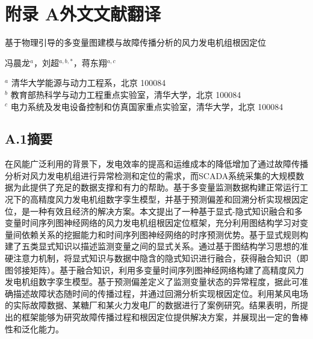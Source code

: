 \cleardoublepage
\chapter*{附录 A\quad 外文文献翻译}

\begin{center}
{\heiti\fontsize{14pt}{20pt}\selectfont 基于物理引导的多变量图建模与故障传播分析的风力发电机组根因定位}
\end{center}

\vspace{6pt}
\begin{center}
冯晨龙$^{a}$，刘超$^{a,b,*}$，蒋东翔$^{a,c}$

\vspace{4pt}
{\small
$^{a}$ 清华大学能源与动力工程系，北京 100084 \\
$^{b}$ 教育部热科学与动力工程重点实验室，清华大学，北京 100084 \\
$^{c}$ 电力系统及发电设备控制和仿真国家重点实验室，清华大学，北京 100084 \\
}
\end{center}

\vspace{6pt}

\vspace{12pt}

\section*{A.1\quad 摘要}

在风能广泛利用的背景下，发电效率的提高和运维成本的降低增加了通过故障传播分析对风力发电机组进行异常检测和定位的需求，而SCADA系统采集的大规模数据为此提供了充足的数据支撑和有力的帮助。基于多变量监测数据构建正常运行工况下的高精度风力发电机组数字孪生模型，并基于预测偏差和回溯分析实现根因定位，是一种有效且经济的解决方案。本文提出了一种基于显式-隐式知识融合和多变量时间序列图神经网络的风力发电机组根因定位框架，充分利用图结构学习对变量间依赖关系的挖掘能力和时间序列图神经网络的时序预测优势。基于显式规则构建了五类显式知识以描述监测变量之间的显式关系。通过基于图结构学习思想的准硬注意力机制，将显式知识与数据中隐含的隐式知识进行融合，获得融合知识（即图邻接矩阵）。基于融合知识，利用多变量时间序列图神经网络构建了高精度风力发电机组数字孪生模型。基于预测偏差定义了监测变量状态的异常程度，据此可准确描述故障状态随时间的传播过程，并通过回溯分析实现根因定位。利用某风电场的实际故障数据、某糖厂和某火力发电厂的数据进行了案例研究。结果表明，所提出的框架能够为研究故障传播过程和根因定位提供解决方案，并展现出一定的鲁棒性和泛化能力。

